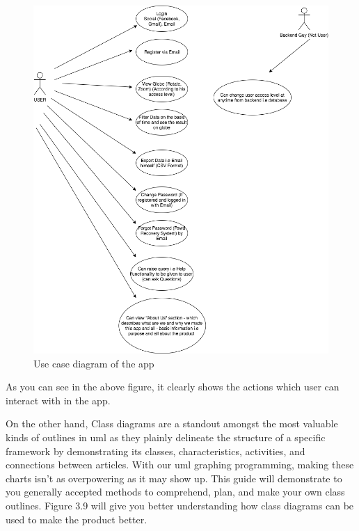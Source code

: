     \begin{figure}[H]
            \centering
            \includegraphics[width=1.0\linewidth]{figures/ch3/usecase.png}
            \caption{\label{fig:use_case} Use case diagram of the app}
    \end{figure}

As you can see in the above figure, it clearly shows the actions which user can interact with in the app.

On the other hand, Class diagrams are a standout amongst the most valuable kinds of outlines in \gls{uml} as they plainly delineate the structure of a specific framework by demonstrating its classes, characteristics, activities, and connections between articles. With our  \gls{uml} graphing programming, making these charts isn't as overpowering as it may show up. This guide will demonstrate to you generally accepted methods to comprehend, plan, and make your own class outlines. Figure 3.9 will give you better understanding how class diagrams can be used to make the product better.

